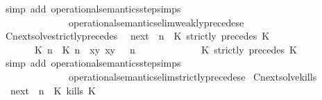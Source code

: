 \begin{isabellebody}
%
\isadelimproof
%
\endisadelimproof
%
\isatagproof
{}\isamarkupfalse%
\ {\isacharparenleft}simp\ add{\isacharcolon}\ operational{\isacharunderscore}semantics{\isacharunderscore}step{\isachardot}simps\isanewline
\ \ \ \ \ \ \ \ \ \ \ \ \ \ operational{\isacharunderscore}semantics{\isacharunderscore}elim{\isachardot}weakly{\isacharunderscore}precedes{\isacharunderscore}e{\isacharparenright}%
\endisatagproof
{\isafoldproof}%
%
\isadelimproof
\isanewline
%
\endisadelimproof
\isanewline
{}\isamarkupfalse%
\ Cnext{\isacharunderscore}solve{\isacharunderscore}strictly{\isacharunderscore}precedes{\isacharcolon}\isanewline
\ \ {\isacartoucheopen}{\isacharparenleft}{\isasymC}\isactrlsub n\isactrlsub e\isactrlsub x\isactrlsub t\ {\isacharparenleft}{\isasymGamma}{\isacharcomma}\ n\ {\isasymturnstile}\ {\isacharparenleft}{\isacharparenleft}K\ strictly\ precedes\ K\ {\isacharhash}\ {\isasymPsi}{\isacharparenright}\ {\isasymtriangleright}\ {\isasymPhi}{\isacharparenright}{\isacharparenright}\isanewline
\ \ \ \ {\isasymsupseteq}\ {\isacharbraceleft}\ {\isacharparenleft}{\isacharparenleft}{\isasymlceil}{\isacharhash}\isactrlsup {\isasymle}\ K\ n{\isacharcomma}\ {\isacharhash}\isactrlsup {\isacharless}\ K\ n{\isasymrceil}\ {\isasymin}\ {\isacharparenleft}{\isasymlambda}{\isacharparenleft}x{\isacharcomma}y{\isacharparenright}{\isachardot}\ x{\isasymle}y{\isacharparenright}{\isacharparenright}\ {\isacharhash}\ {\isasymGamma}{\isacharparenright}{\isacharcomma}\ n\isanewline
\ \ \ \ \ \ \ \ \ \ {\isasymturnstile}\ {\isasymPsi}\ {\isasymtriangleright}\ {\isacharparenleft}{\isacharparenleft}K\ strictly\ precedes\ K\ {\isacharhash}\ {\isasymPhi}{\isacharparenright}\ {\isacharbraceright}{\isacartoucheclose}\isanewline
%
\isadelimproof
%
\endisadelimproof
%
\isatagproof
{}\isamarkupfalse%
\ {\isacharparenleft}simp\ add{\isacharcolon}\ operational{\isacharunderscore}semantics{\isacharunderscore}step{\isachardot}simps\isanewline
\ \ \ \ \ \ \ \ \ \ \ \ \ \ operational{\isacharunderscore}semantics{\isacharunderscore}elim{\isachardot}strictly{\isacharunderscore}precedes{\isacharunderscore}e{\isacharparenright}%
\endisatagproof
{\isafoldproof}%
%
\isadelimproof
\isanewline
%
\endisadelimproof
\isanewline
{}\isamarkupfalse%
\ Cnext{\isacharunderscore}solve{\isacharunderscore}kills{\isacharcolon}\isanewline
\ \ {\isacartoucheopen}{\isacharparenleft}{\isasymC}\isactrlsub n\isactrlsub e\isactrlsub x\isactrlsub t\ {\isacharparenleft}{\isasymGamma}{\isacharcomma}\ n\ {\isasymturnstile}\ {\isacharparenleft}{\isacharparenleft}K\ kills\ K\ {\isacharhash}\ {\isasymPsi}{\isacharparenright}\ {\isasymtriangleright}\ {\isasymPhi}{\isacharparenright}{\isacharparenright}\isanewline

\end{isabellebody}
